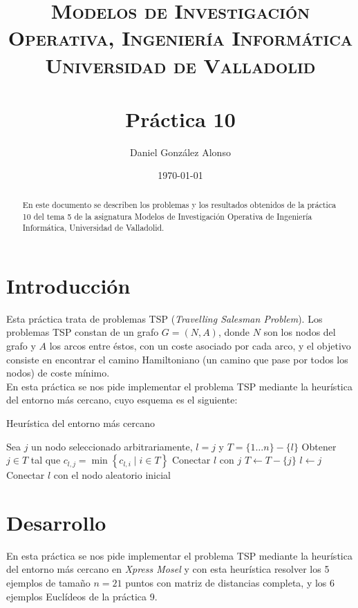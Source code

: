 \documentclass[a4paper,11pt]{article}
\title{
	\vspace{-25pt}
	\normalfont \Large \textsc{
		Modelos de Investigación Operativa,
        Ingeniería Informática\\
        Universidad de Valladolid
	}\\[10pt]
	\horrule{1pt}\\[10pt]
	\huge \textbf{
		Práctica 10
	}\\
	\horrule{1pt}
}
\author{
	\normalfont \Large Daniel González Alonso
}
\date{
	\normalfont \large \today
}
\begin{document}
\maketitle

\begin{abstract}
	En este documento se describen los problemas y los resultados obtenidos de la práctica 10 del tema 5 de la asignatura Modelos de Investigación Operativa de Ingeniería Informática, Universidad de Valladolid.
\end{abstract}

\section{Introducción}
Esta práctica trata de problemas TSP (\textit{Travelling Salesman Problem}). Los problemas TSP constan de un grafo ${G=(N,A)}$, donde ${N}$ son los nodos del grafo y ${A}$ los arcos entre éstos, con un coste asociado por cada arco, y el objetivo consiste en encontrar el camino Hamiltoniano (un camino que pase por todos los nodos) de coste mínimo.\\

En esta práctica se nos pide implementar el problema TSP mediante la heurística del entorno más cercano, cuyo esquema es el siguiente:

\begin{algorithm}[!htbp]
\caption{Heurística del entorno más cercano}
\label{alg_entorno_cercano}
\begin{algorithmic}[1]
\State Sea ${j}$ un nodo seleccionado arbitrariamente, ${l=j}$ y ${T=\{1 \ldots n\} - \{l\}}$
	\State Obtener ${j \in T}$ tal que ${c_{l,j} = \min\left\{ c_{l,i} \mid i \in T \right\}}$
    \State Conectar ${l}$ con ${j}$
    \State ${T \gets T - \{j\}}$
    \State ${l \gets j}$
\EndWhile
\State Conectar ${l}$ con el nodo aleatorio inicial
\end{algorithmic}
\end{algorithm}

\newpage
\section{Desarrollo}
En esta práctica se nos pide implementar el problema TSP mediante la heurística del entorno más cercano en \textit{Xpress Mosel} y con esta heurística resolver los 5 ejemplos de tamaño ${n = 21}$ puntos con matriz de distancias completa, y los 6 ejemplos Euclídeos de la práctica 9.\\
\end{document}
